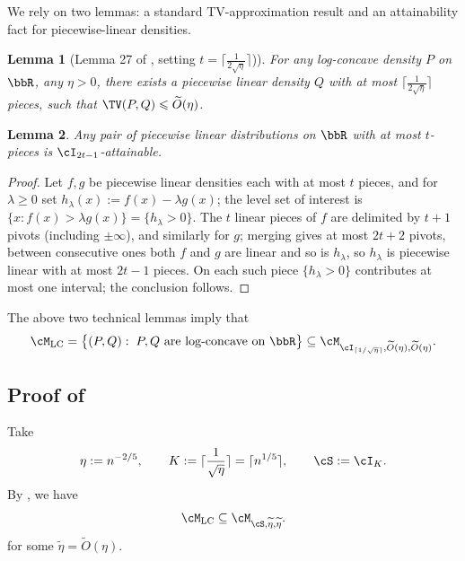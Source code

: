 \documentclass[english]{article}
\theoremstyle{plain}
\newtheorem{lemma}{Lemma}[section]
\theoremstyle{definition}
\begin{document}
We rely on two lemmas: a standard TV-approximation result and an attainability fact for piecewise-linear densities.



\begin{lemma}[Lemma 27 of \cite{chan2014efficient}, setting \(t = \lceil\frac{1}{2\sqrt{\eta}}\rceil\))] \label{TV-approx}
    For any log-concave density $P$ on $\bbR$, any $\eta>0$, there exists a piecewise linear density $Q$ with at most $\lceil\frac{1}{2\sqrt{\eta}}\rceil$ pieces, such that $\TV(P,Q)\leqslant \widetilde{O}(\eta)$.
\end{lemma}

\begin{lemma} \label{lem:piecewise-attainable}
    Any pair of piecewise linear distributions on $\bbR$ with at most $t$-pieces is $\cI_{2t-1}$-attainable.
\end{lemma}


\begin{proof}
Let $f,g$ be piecewise linear densities each with at most $t$ pieces, and for $\lambda\geqslant 0$ set $h_\lambda(x):=f(x)-\lambda g(x)$; the level set of interest is $\{x:f(x)>\lambda g(x)\}=\{h_\lambda>0\}$. The $t$ linear pieces of $f$ are delimited by $t+1$ pivots (including $\pm\infty$), and similarly for $g$; merging gives at most $2t+2$ pivots, between consecutive ones both $f$ and $g$ are linear and so is $h_\lambda$, so $h_\lambda$ is piecewise linear with at most $2t-1$ pieces. On each such piece $\{h_\lambda>0\}$ contributes at most one interval; the conclusion follows.
\end{proof}


The above two technical lemmas imply that
\[
\cM_{\mathrm{LC}}
=
\bigl\{(P,Q):\; P,Q \text{ are log-concave on } \bbR\bigr\}
\subseteq
\cM_{\cI_{\lceil 1/\sqrt{\eta}\rceil},
\widetilde{O}(\eta),\widetilde{O}(\eta)} .
\]


\subsection{Proof of }\label{sec:proof-cor-log-concave}
Take
\[
\eta := n^{-2/5},
\qquad
K := \lceil\frac{1}{\sqrt{\eta}}\rceil=\lceil n^{1/5}\rceil,
\qquad
\cS:=\cI_K .
\]
By , we have
\[
\cM_{\mathrm{LC}} \subseteq \cM_{\cS,\widetilde{\eta},\widetilde{\eta}}.
\]
for some \(\widetilde{\eta}=\widetilde{O}({\eta})\).
\end{document}
